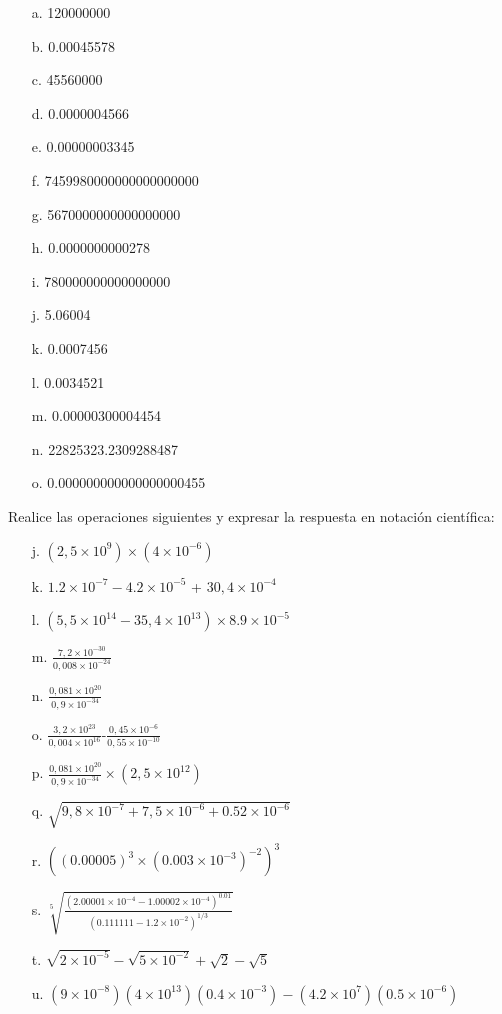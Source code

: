 \begin{itemize}
 \item[a.] 120000000
 \item[b.] 0.00045578
 \item[c.] 45560000
 \item[d.] 0.0000004566
 \item[e.] 0.00000003345
 \item[f.] 7459980000000000000000
 \item[g.] 5670000000000000000
 \item[h.] 0.0000000000278
 \item[i.] 780000000000000000
 \item[j.] 5.06004 
 \item[k.] 0.0007456
 \item[l.] 0.0034521
 \item[m.] 0.00000300004454
 \item[n.] 22825323.2309288487
 \item[o.] 0.000000000000000000455
\end{itemize}

Realice las operaciones siguientes y expresar la respuesta en notación científica:

\begin{itemize}
 \item[j.] $(2,5\times10^{9})\times(4\times10^{-6})$
 \item[k.] $1.2\times10^{-7}-4.2\times10^{-5}$ + $30,4\times10^{-4}$
 \item[l.] $(5,5\times10^{14}-35,4\times10^{13})\times 8.9\times10^{-5}$
 \item[m.] $\frac{7,2\times10^{-30}}{0,008\times10^{-24}}$
 \item[n.] $\frac{0,081\times10^{20}}{0,9\times10^{-34}}$
\item[o.]  $\frac{3,2\times10^{23}}{0,004\times10^{16}}$-$\frac{0,45\times10^{-6}}{0,55\times10^{-10}}$
\item[p.] $\frac{0,081\times10^{20}}{0,9\times10^{-34}}\times(2,5\times10^{12})$
\item[q.] $\sqrt{9,8\times10^{-7}+7,5\times10^{-6}+0.52\times 10^{-6}}$
\item[r.] $((0.00005)^3\times (0.003\times 10^{-3})^{-2})^3$
\item[s.] $\sqrt[5]{\frac{(2.00001\times 10^{-4} - 1.00002\times 10^{-4})^{0.01}}{(0.111111-1.2\times 10^{-2})^{1/3}}}$
\item[t.] $\sqrt{2\times 10^{-5}}-\sqrt{5\times 10^{-2}} + \sqrt{2} - \sqrt{5}$
\item[u.] $ (9\times10^{-8})(4\times 10^{13})(0.4\times10^{-3})-(4.2\times 10^7)(0.5\times10^{-6})$
\end{itemize}

